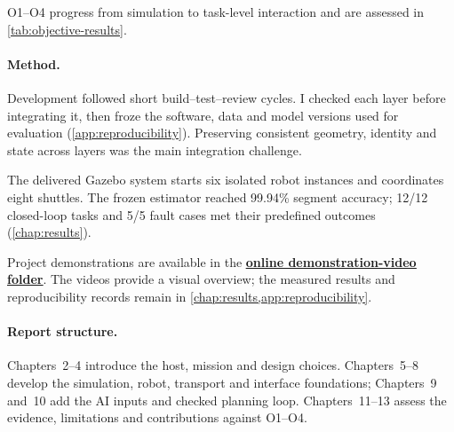 O1--O4 progress from simulation to task-level interaction and are assessed in
\cref{tab:objective-results}.

\paragraph{Method.}

Development followed short build--test--review cycles. I checked each layer
before integrating it, then froze the software, data and model versions used for
evaluation (\cref{app:reproducibility}). Preserving consistent geometry,
identity and state across layers was the main integration challenge.

The delivered Gazebo system starts six isolated robot instances and coordinates
eight shuttles. The frozen estimator reached 99.94\% segment accuracy; 12/12
closed-loop tasks and 5/5 fault cases met their predefined outcomes
(\cref{chap:results}).

\begin{keybox}
Project demonstrations are available in the
\href{https://1drv.ms/f/c/b9a744d4252a8ea4/IgDZe0nBqhLRQYNN5V2g-S-nAVb9ZIn0VUSxfA4CWJeYxTA?e=eGmKr2}
{\textcolor{mfjablue}{\textbf{\underline{online demonstration-video folder}}}}.
The videos provide a visual
overview; the measured results and reproducibility records remain in
\cref{chap:results,app:reproducibility}.
\end{keybox}

\paragraph{Report structure.}
Chapters~2--4 introduce the host, mission and design choices. Chapters~5--8
develop the simulation, robot, transport and interface foundations; Chapters~9
and~10 add the AI inputs and checked planning loop. Chapters~11--13 assess the
evidence, limitations and contributions against O1--O4.
